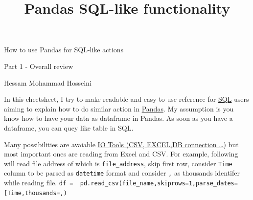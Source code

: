 \documentclass[11pt]{article}
\title{Pandas SQL-like functionality}
\begin{document}
    
    \maketitle
    
    

    
    How to use Pandas for SQL-like actions

Part 1 - Overall review

Hessam Mohammad Hosseini

In this cheetsheet, I try to make readable and easy to use reference for
\href{https://en.wikipedia.org/wiki/SQL}{SQL} users aiming to explain
how to do similar action in \href{https://pandas.pydata.org/}{Pandas}.
My assumption is you know how to have your data as dataframe in Pandas.
As soon as you have a dataframe, you can quey like table in SQL.

Many possibilities are avaiable
\href{https://pandas.pydata.org/pandas-docs/stable/user_guide/io.html}{IO
Tools (CSV, EXCEL,DB connection \ldots)} but most important ones are
reading from Excel and CSV. For example, following will read file
address of which is \texttt{file\_address}, skip first row, consider
\texttt{Time} column to be parsed as \texttt{datetime} format and
consider \texttt{,} as thousands identifer while reading file.
\texttt{df\ =\ \ pd.read\_csv(file\_name,skiprows=1,parse\_dates={[}\textquotesingle{}Time\textquotesingle{}{]},thousands=\textquotesingle{},\textquotesingle{})}
\end{document}
